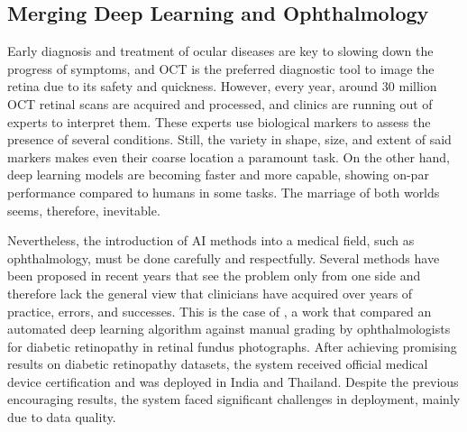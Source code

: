 \subsection{Merging Deep Learning and Ophthalmology}
Early diagnosis and treatment of ocular diseases are key to slowing down the progress of symptoms, and OCT is the preferred diagnostic tool to image the retina due to its safety and quickness. However, every year, around 30 million OCT retinal scans are acquired and processed, and clinics are running out of experts to interpret them. These experts use biological markers to assess the presence of several conditions. Still, the variety in shape, size, and extent of said markers makes even their coarse location a paramount task. On the other hand, deep learning models are becoming faster and more capable, showing on-par performance compared to humans in some tasks. The marriage of both worlds seems, therefore, inevitable. 

Nevertheless, the introduction of AI methods into a medical field, such as ophthalmology, must be done carefully and respectfully. Several methods have been proposed in recent years that see the problem only from one side  and therefore lack the general view that clinicians have acquired over years of practice, errors, and successes. This is the case of , a work that compared an automated deep learning algorithm against manual grading by ophthalmologists for diabetic retinopathy in retinal fundus photographs. After achieving promising results on diabetic retinopathy datasets, the system received official medical device certification and was deployed in India and Thailand. Despite the previous encouraging results, the system faced significant challenges in deployment, mainly due to data quality.
